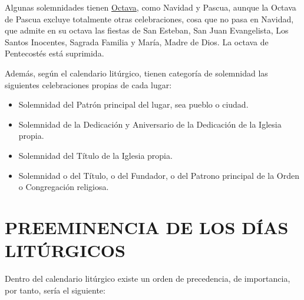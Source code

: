 \documentclass[letterpaper, 12pt]{book}
\begin{document}
    Algunas solemnidades tienen \underline{Octava}, como Navidad y Pascua, aunque la Octava de Pascua excluye totalmente otras celebraciones, cosa que no pasa en Navidad, que admite en su octava las fiestas de San Esteban, San Juan Evangelista, Los Santos Inocentes, Sagrada Familia y María, Madre de Dios. La octava de Pentecostés está suprimida.\newline
    
    Adem\'as, seg\'un el calendario lit\'urgico, tienen categor\'ia de solemnidad las siguientes celebraciones propias de cada lugar:
    
    \begin{itemize}
        \item Solemnidad del Patr\'on principal del lugar, sea pueblo o ciudad.
        \item Solemnidad de la Dedicaci\'on y Aniversario de la Dedicaci\'on de la Iglesia propia.
        \item Solemnidad del T\'itulo de la Iglesia propia.
        \item Solemnidad o del T\'itulo, o del Fundador, o del Patrono principal de la Orden o Congregación religiosa.
    \end{itemize}
    
    \chapter{PREEMINENCIA DE LOS D\'IAS LIT\'URGICOS}
    Dentro del calendario lit\'urgico existe un orden de precedencia, de importancia, por tanto, sería el siguiente:
    
\end{document}

